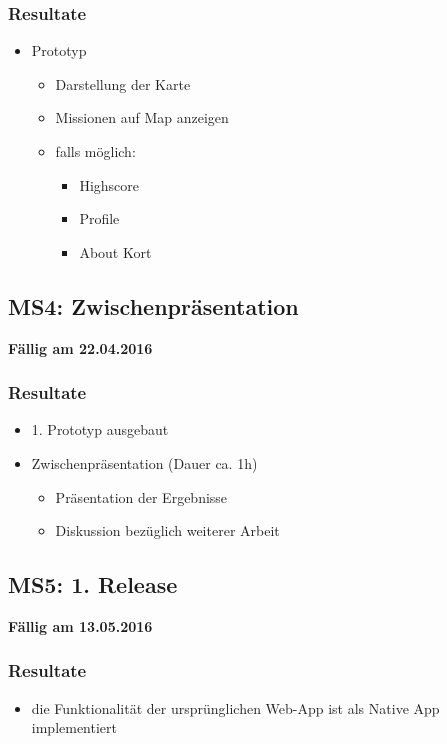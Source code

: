 \subsubsection{Resultate}
\begin{itemize}
	\item {} Prototyp
	\begin{itemize}
		\item Darstellung der Karte
		\item Missionen auf Map anzeigen
		\item falls möglich:
		\begin{itemize}
			\item Highscore
			\item Profile
			\item About Kort
		\end{itemize}
	\end{itemize}
\end{itemize}

\subsection{MS4: Zwischenpräsentation}
\label{pm-ms4}
\textbf{Fällig am 22.04.2016}
\subsubsection{Resultate}
\begin{itemize}
	\item 1. Prototyp ausgebaut
	\item Zwischenpräsentation (Dauer ca. 1h)
	\begin{itemize}
		\item Präsentation der Ergebnisse
		\item Diskussion bezüglich weiterer Arbeit
	\end{itemize}
\end{itemize}

\subsection{MS5: 1. Release}
\label{pm-ms5}
\textbf{Fällig am 13.05.2016}
\subsubsection{Resultate}
\begin{itemize}
	\item die Funktionalität der ursprünglichen \kort{} Web-App ist als Native App implementiert
\end{itemize}

